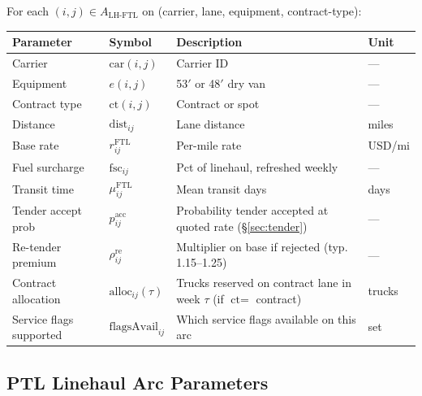 \documentclass[11pt,a4paper]{article}
\theoremstyle{definition}
\begin{document}
For each $(i,j) \in A_{\text{LH-FTL}}$ on (carrier, lane, equipment, contract-type):
\begin{center}
\begin{tabular}{llp{6cm}l}
\toprule
Parameter & Symbol & Description & Unit \\
\midrule
Carrier & $\text{car}(i,j)$ & Carrier ID & — \\
Equipment & $e(i,j)$ & 53$'$ or 48$'$ dry van & — \\
Contract type & $\text{ct}(i,j)$ & Contract or spot & — \\
Distance & $\text{dist}_{ij}$ & Lane distance & miles \\
Base rate & $r_{ij}^{\text{FTL}}$ & Per-mile rate & USD/mi \\
Fuel surcharge & $\text{fsc}_{ij}$ & Pct of linehaul, refreshed weekly & — \\
Transit time & $\mu_{ij}^{\text{FTL}}$ & Mean transit days & days \\
Tender accept prob & $p_{ij}^{\text{acc}}$ & Probability tender accepted at quoted rate (\S\ref{sec:tender}) & — \\
Re-tender premium & $\rho_{ij}^{\text{re}}$ & Multiplier on base if rejected (typ. 1.15--1.25) & — \\
Contract allocation & $\text{alloc}_{ij}(\tau)$ & Trucks reserved on contract lane in week $\tau$ (if $\text{ct} = $ contract) & trucks \\
Service flags supported & $\text{flagsAvail}_{ij}$ & Which service flags available on this arc & set \\
\bottomrule
\end{tabular}
\end{center}

\subsection{PTL Linehaul Arc Parameters}
\end{document}
